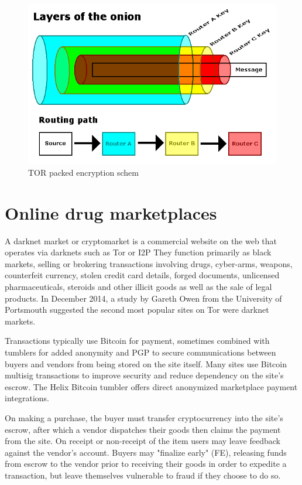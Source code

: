 \documentclass[
  digital, %
  table,   %
  lof,     %
  lot,     %
  oneside
]{fithesis3}
\begin{document}
  \begin{figure}[!htb]
    \centering
    \includegraphics[width=1\textwidth]{tor-packet-prejate}
    \caption{TOR packed encryption schem}
    \label{TOR packed encryption schema}
\end{figure}
 
 
 
 
 

\section{Online drug marketplaces}
A darknet market or cryptomarket is a commercial website on the web that operates via darknets such as Tor or I2P
They function primarily as black markets, selling or brokering transactions involving drugs, cyber-arms, weapons,
counterfeit currency, stolen credit card details, forged documents, unlicensed pharmaceuticals, steroids and
other illicit goods as well as the sale of legal products. In December 2014, a study by Gareth Owen from the University
of Portsmouth suggested the second most popular sites on Tor were darknet markets.

Transactions typically use Bitcoin for payment, sometimes combined with tumblers for added anonymity and PGP to secure communications
between buyers and vendors from being stored on the site itself. Many sites use Bitcoin multisig transactions 
to improve security and reduce dependency on the site's escrow. The Helix Bitcoin tumbler offers direct anonymized marketplace payment integrations.

On making a purchase, the buyer must transfer cryptocurrency into the site's escrow, after which a vendor dispatches their goods then claims the
payment from the site. On receipt or non-receipt of the item users may leave feedback against the vendor's account. Buyers may "finalize early"
(FE), releasing funds from escrow to the vendor prior to receiving their goods in order to expedite a transaction, but leave themselves vulnerable to fraud if they choose to do so.
\end{document}
